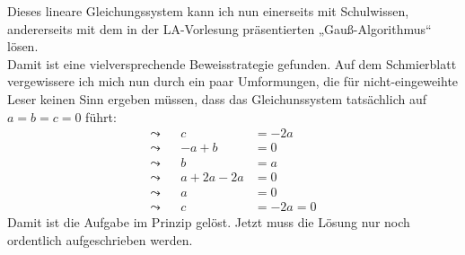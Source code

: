 \begin{phasetwo}[Rumprobieren]
    Dieses lineare Gleichungssystem kann ich nun einerseits mit Schulwissen, andererseits mit dem in der LA-Vorlesung präsentierten „Gauß-Algorithmus“ lösen. \\[0.5em]
    Damit ist eine vielversprechende Beweisstrategie gefunden. Auf dem Schmierblatt vergewissere ich mich nun durch ein paar Umformungen, die für nicht-eingeweihte Leser keinen Sinn ergeben müssen, dass das Gleichunssystem tatsächlich auf $a=b=c=0$ führt:
    \begingroup
    \allowdisplaybreaks
    \begin{align*}
        \leadsto&&   c & = -2a \\
        \leadsto&& -a + b & = 0 \\
        \leadsto&& b& = a \\
        \leadsto&& a +2a-2a & = 0 \\
        \leadsto&& a &= 0 \\
        \leadsto && c & = -2a=0
    \end{align*}
    \endgroup
    Damit ist die Aufgabe im Prinzip gelöst. Jetzt muss die Lösung nur noch ordentlich aufgeschrieben werden.
\end{phasetwo}


